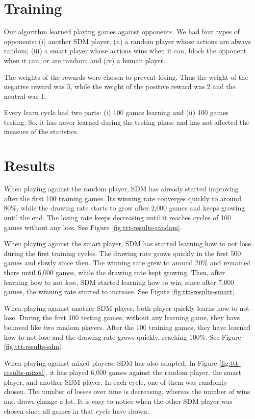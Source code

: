 \section{Training}

Our algorithm learned playing games against opponents. We had four types of opponents: (i) another SDM player, (ii) a random player whose actions are always random; (iii) a smart player whose actions wins when it can, block the opponent when it can, or are random; and (iv) a human player.

The weights of the rewards were chosen to prevent losing. Thus the weight of the negative reward was 5, while the weight of the positive reward was 2 and the neutral was 1.

Every learn cycle had two parts: (i) 100 games learning and (ii) 100 games testing. So, it has never learned during the testing phase and has not affected the measure of the statistics.


\section{Results}

When playing against the random player, SDM has already started improving after the first 100 training games. Its winning rate converges quickly to around 80\%, while the drawing rate starts to grow after 2,000 games and keeps growing until the end. The losing rate keeps decreasing until it reaches cycles of 100 games without any loss. See Figure \ref{fig:ttt-results-random}.

When playing against the smart player, SDM has started learning how to not lose during the first training cycles. The drawing rate grows quickly in the first 500 games and slowly since then. The winning rate grew to around 20\% and remained there until 6,000 games, while the drawing rate kept growing. Then, after learning how to not lose, SDM started learning how to win, since after 7,000 games, the winning rate started to increase. See Figure \ref{fig:ttt-results-smart}.

When playing against another SDM player, both player quickly learns how to not lose. During the first 100 testing games, without any learning game, they have behaved like two random players. After the 100 training games, they have learned how to not lose and the drawing rate grows quickly, reaching 100\%. See Figure \ref{fig:ttt-results-sdm}.

When playing against mixed players, SDM has also adapted. In Figure \ref{fig:ttt-results-mixed}, it has played 6,000 games against the random player, the smart player, and another SDM player. In each cycle, one of them was randomly chosen. The number of losses over time is decreasing, whereas the number of wins and draws change a lot. It is easy to notice when the other SDM player was chosen since all games in that cycle have drawn.

